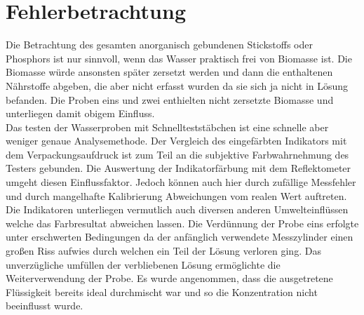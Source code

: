 \chapter{Fehlerbetrachtung}
\label{sec:fehler}

Die Betrachtung des gesamten anorganisch gebundenen Stickstoffs oder Phosphors ist nur sinnvoll, wenn das Wasser praktisch frei von Biomasse ist. Die Biomasse würde ansonsten später zersetzt werden und dann die enthaltenen Nährstoffe abgeben, die aber nicht erfasst wurden da sie sich ja nicht in Lösung befanden. Die Proben eins und zwei enthielten nicht zersetzte Biomasse und unterliegen damit obigem Einfluss. \\
Das testen der Wasserproben mit Schnellteststäbchen ist eine schnelle aber weniger genaue Analysemethode. Der Vergleich des eingefärbten Indikators mit dem Verpackungsaufdruck ist zum Teil an die subjektive Farbwahrnehmung des Testers gebunden. Die Auswertung der Indikatorfärbung mit dem Reflektometer umgeht diesen Einflussfaktor. Jedoch können auch hier durch zufällige Messfehler und durch mangelhafte Kalibrierung Abweichungen vom realen Wert auftreten. Die Indikatoren unterliegen vermutlich auch diversen anderen Umwelteinflüssen welche das Farbresultat abweichen lassen. Die Verdünnung der Probe eins erfolgte unter erschwerten Bedingungen da der anfänglich verwendete Messzylinder einen großen Riss aufwies durch welchen ein Teil der Lösung verloren ging. Das unverzügliche umfüllen der verbliebenen Lösung ermöglichte die Weiterverwendung der Probe. Es wurde angenommen, dass die ausgetretene Flüssigkeit bereits ideal durchmischt war und so die Konzentration nicht beeinflusst wurde.